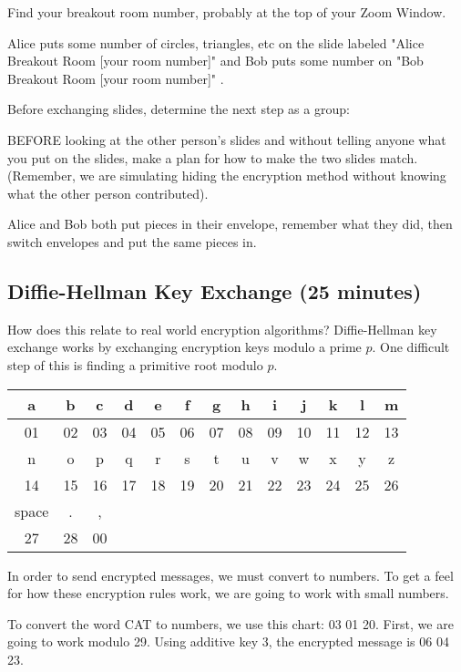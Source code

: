 \documentclass[letterpaper, 11 pt]{article}
\begin{document}
\begin{br}[15 minutes]
Find your breakout room number, probably at the top of your Zoom Window.

Alice puts some number of circles, triangles, etc on the slide labeled "Alice Breakout Room [your room number]" and Bob puts some number on "Bob Breakout Room [your room number]" . 

Before exchanging slides, determine the next step as a group:

BEFORE looking at the other person's slides and without telling anyone what you put on the slides, make a plan for how to make the two slides match. (Remember, we are simulating hiding the encryption method without knowing what the other person contributed).
\end{br}

\begin{solution}
 Alice and Bob both put pieces in their envelope, remember what they did, then switch envelopes and put the same pieces in.
\end{solution}
\subsection{Diffie-Hellman Key Exchange (25 minutes)}
How does this relate to real world encryption algorithms? Diffie-Hellman key exchange works by exchanging encryption keys modulo a prime $p$. One difficult step of this is finding a primitive root modulo $p$. 


\begin{center}
\begin{tabular}{|c|c|c|c|c|c|c|c|c|c|c|c|c|}\hline
 a&b&c&d&e&f&g&h&i&j&k&l&m\\\hline
 01&02&03&04&05&06&07&08&09&10&11&12&13\\\hline\hline
 n&o&p&q&r&s&t&u&v&w&x&y&z\\\hline
 14&15&16&17&18&19&20&21&22&23&24&25&26\\\hline
 space&.&,\\\hline
 27&28&00\\\hline
\end{tabular}
\end{center}

In order to send encrypted messages, we must convert to numbers. To get a feel for how these encryption rules work, we are going to work with small numbers.

To convert the word CAT to numbers, we use this chart: 03 01 20. First, we are going to work modulo 29. Using additive key $3$, the encrypted message is 06 04 23.
\end{document}
